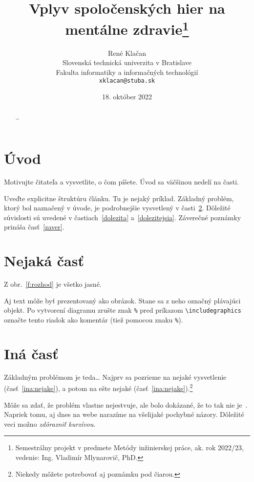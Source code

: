 \documentclass[10pt,oneside,slovak,a4paper]{article}
\title{Vplyv spoločenských hier na mentálne zdravie\thanks{Semestrálny projekt v predmete Metódy inžinierskej práce, ak. rok 2022/23, vedenie: Ing. Vladimír Mlynarovič, PhD.}} %
\author{René Klačan\\[2pt]
	{\small Slovenská technická univerzita v Bratislave}\\
	{\small Fakulta informatiky a informačných technológií}\\
	{\small \texttt{xklacan@stuba.sk}}
	}
\date{\small 18. október 2022}
\begin{document}
\maketitle
\begin{abstract}
\ldots
\end{abstract}



\section{Úvod}

Motivujte čitateľa a vysvetlite, o čom píšete. Úvod sa väčšinou nedelí na časti.

Uveďte explicitne štruktúru článku. Tu je nejaký príklad.
Základný problém, ktorý bol naznačený v úvode, je podrobnejšie vysvetlený v časti~\ref{nejaka}.
Dôležité súvislosti sú uvedené v častiach~\ref{dolezita} a~\ref{dolezitejsia}.
Záverečné poznámky prináša časť~\ref{zaver}.



\section{Nejaká časť} \label{nejaka}

Z obr.~\ref{f:rozhod} je všetko jasné. 

\begin{figure*}[tbh]
\centering
Aj text môže byť prezentovaný ako obrázok. Stane sa z neho označný plávajúci objekt. Po vytvorení diagramu zrušte znak \texttt{\%} pred príkazom \verb|\includegraphics| označte tento riadok ako komentár (tiež pomocou znaku \texttt{\%}).
\caption{Rozhodujúci argument.}
\label{f:rozhod}
\end{figure*}



\section{Iná časť} \label{ina}

Základným problémom je teda\ldots{} Najprv sa pozrieme na nejaké vysvetlenie (časť~\ref{ina:nejake}), a potom na ešte nejaké (časť~\ref{ina:nejake}).\footnote{Niekedy môžete potrebovať aj poznámku pod čiarou.}

Môže sa zdať, že problém vlastne nejestvuje\cite{Coplien:MPD}, ale bolo dokázané, že to tak nie je~\cite{Czarnecki:Staged, Czarnecki:Progress}. Napriek tomu, aj dnes na webe narazíme na všelijaké pochybné názory\cite{PLP-Framework}. Dôležité veci možno \emph{zdôrazniť kurzívou}.
\end{document}
